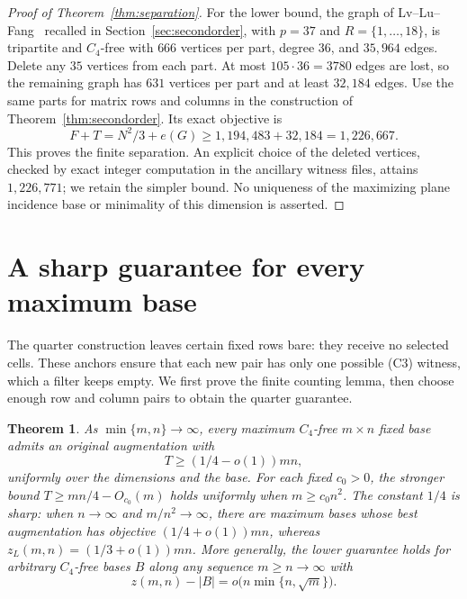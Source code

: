 \documentclass[11pt]{article}
\newtheorem{theorem}{Theorem}
\newcommand{\zl}{z_L}
\begin{document}
\begin{proof}[Proof of Theorem~\ref{thm:separation}]
For the lower bound, the graph of Lv--Lu--Fang~\cite[Theorem 4]{llf}
recalled in Section~\ref{sec:secondorder}, with $p=37$ and
$R=\{1,\ldots,18\}$, is tripartite and $C_4$-free with $666$ vertices per
part, degree $36$, and $35{,}964$ edges. Delete any $35$ vertices from each
part. At most $105\cdot36=3780$ edges are lost, so the remaining graph
has $631$ vertices per part and at least $32{,}184$ edges.
Use the same parts for
matrix rows and columns in the construction of
Theorem~\ref{thm:secondorder}. Its exact objective is
\[
 F+T=N^2/3+e(G)\ge1{,}194{,}483+32{,}184=1{,}226{,}667.
\]
This proves the finite separation. An explicit choice of the deleted
vertices, checked by exact integer computation in the ancillary witness
files, attains $1{,}226{,}771$; we retain the simpler bound. No uniqueness
of the maximizing plane incidence base or minimality of this dimension is
asserted.
\end{proof}

\section{A sharp guarantee for every maximum base}\label{sec:everymaximum}
The quarter construction leaves certain fixed rows bare: they receive
no selected cells. These anchors ensure that each new pair has only one
possible (C3) witness, which a filter keeps empty. We first prove the
finite counting lemma, then choose enough row and column pairs to obtain
the quarter guarantee.

\begin{theorem}\label{thm:everymaximum}
As $\min\{m,n\}\to\infty$, every maximum $C_4$-free $m\times n$
fixed base admits an original augmentation with
\[
 T\ge(1/4-o(1))mn,
\]
uniformly over the dimensions and the base. For each fixed $c_0>0$,
the stronger bound $T\ge mn/4-O_{c_0}(m)$ holds uniformly when
$m\ge c_0n^2$. The constant $1/4$ is sharp:
when $n\to\infty$ and $m/n^2\to\infty$, there are maximum bases
whose best augmentation has objective $(1/4+o(1))mn$, whereas
$\zl(m,n)=(1/3+o(1))mn$.
More generally, the lower guarantee holds for arbitrary $C_4$-free bases $B$
along any sequence $m\ge n\to\infty$ with
\[
 z(m,n)-|B|=o\bigl(n\min\{n,\sqrt m\}\bigr).
\]
\end{theorem}
\end{document}
